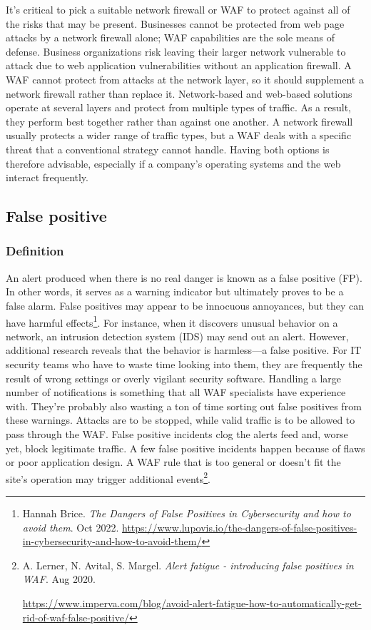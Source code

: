 It's critical to pick a suitable network firewall or WAF to protect against all of the risks that may be present. Businesses cannot be protected from web page attacks by a network firewall alone; WAF capabilities are the sole means of defense. Business organizations risk leaving their larger network vulnerable to attack due to web application vulnerabilities without an application firewall. A WAF cannot protect from attacks at the network layer, so it should supplement a network firewall rather than replace it. Network-based and web-based solutions operate at several layers and protect from multiple types of traffic. As a result, they perform best together rather than against one another. A network firewall usually protects a wider range of traffic types, but a WAF deals with a specific threat that a conventional strategy cannot handle. Having both options is therefore advisable, especially if a company's operating systems and the web interact frequently.
\subsection{False positive}
\subsubsection{Definition}
\hspace{0.5cm}An alert produced when there is no real danger is known as a false positive (FP). In other words, it serves as a warning indicator but ultimately proves to be a false alarm. False positives may appear to be innocuous annoyances, but they can have harmful effects\footnote{Hannah Brice. \textit{The Dangers of False Positives in Cybersecurity and how to avoid them}. Oct 2022. 
\url{https://www.lupovis.io/the-dangers-of-false-positives-in-cybersecurity-and-how-to-avoid-them/}}.
For instance, when it discovers unusual behavior on a network, an intrusion detection system (IDS) may send out an alert. However, additional research reveals that the behavior is harmless—a false positive. For IT security teams who have to waste time looking into them, they are frequently the result of wrong settings or overly vigilant security software.
\newpage
Handling a large number of notifications is something that all WAF specialists have experience with. They're probably also wasting a ton of time sorting out false positives from these warnings. Attacks are to be stopped, while valid traffic is to be allowed to pass through the WAF. False positive incidents clog the alerts feed and, worse yet, block legitimate traffic. A few false positive incidents happen because of flaws or poor application design. A WAF rule that is too general or doesn't fit the site's operation may trigger additional events\footnote{A. Lerner, N. Avital, S. Margel. 
\textit{Alert fatigue - introducing false positives in WAF}. Aug 2020.
\raggedright\url{https://www.imperva.com/blog/avoid-alert-fatigue-how-to-automatically-get-rid-of-waf-false-positive/}}.
